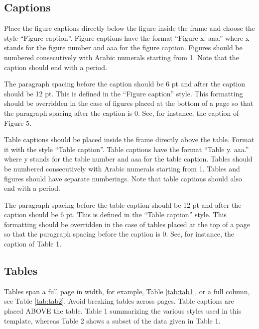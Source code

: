 \documentclass[10pt]{../imeko_acta}
\begin{document}
\subsection{Captions}

Place the figure captions directly below the figure inside the frame and choose the style “Figure caption”. Figure captions have the format “Figure x. aaa.” where x stands for the figure number and aaa for the figure caption. Figures should be numbered consecutively with Arabic numerals starting from 1. Note that the caption should end with a period. 

The paragraph spacing before the caption should be 6 pt and after the caption should be 12 pt. This is defined in the “Figure caption” style. This formatting should be overridden in the case of figures placed at the bottom of a page so that the paragraph spacing after the caption is 0. See, for instance, the caption of Figure 5.

Table captions should be placed inside the frame directly above the table. Format it with the style “Table caption”. Table captions have the format “Table y. aaa.” where y stands for the table number and aaa for the table caption. Tables should be numbered consecutively with Arabic numerals starting from 1. Tables and figures should have separate numberings. Note that table captions should also end with a period. 

The paragraph spacing before the table caption should be 12 pt and after the caption should be 6 pt. This is defined in the “Table caption” style. This formatting should be overridden in the case of tables placed at the top of a page so that the paragraph spacing before the caption is 0. See, for instance, the caption of Table 1.


\subsection{Tables}

Tables span a full page in width, for example, Table \ref{tab:tab1}, or a full column, see Table \ref{tab:tab2}. Avoid breaking tables across pages.
Table captions are placed ABOVE the table. 
Table 1 summarizing the various styles used in this template, whereas Table 2 shows a subset of the data given in Table 1.
\end{document}
